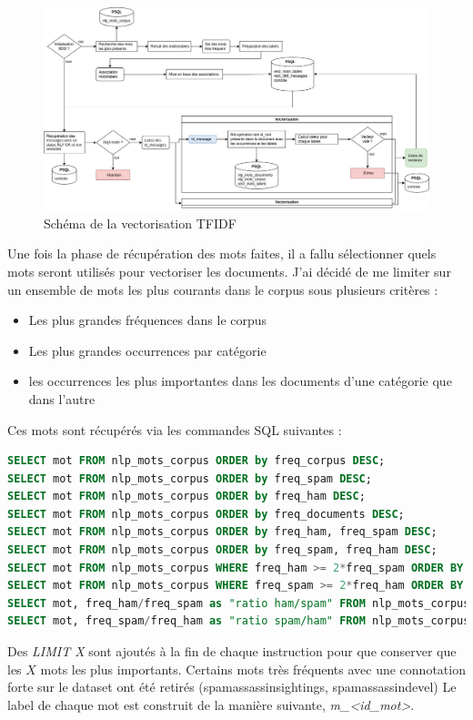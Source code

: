         \begin{figure}[H]
            \includegraphics[width=\linewidth]{img/tfidf}
            \caption{Schéma de la vectorisation TFIDF}
            \label{fig:tfidf}
        \end{figure}

        Une fois la phase de récupération des mots faites, il a fallu sélectionner quels mots seront utilisés pour vectoriser les documents.
        J'ai décidé de me limiter sur un ensemble de mots les plus courants dans le corpus sous plusieurs critères :
        \begin{itemize}
            \item Les plus grandes fréquences dans le corpus
            \item Les plus grandes occurrences par catégorie
            \item les occurrences les plus importantes dans les documents d'une catégorie que dans l'autre
        \end{itemize}
        Ces mots sont récupérés via les commandes SQL suivantes :
        \begin{lstlisting}[title=Commandes SQL pour récupérer les mots les plus présent, language=SQL]
SELECT mot FROM nlp_mots_corpus ORDER by freq_corpus DESC;
SELECT mot FROM nlp_mots_corpus ORDER by freq_spam DESC;
SELECT mot FROM nlp_mots_corpus ORDER by freq_ham DESC;
SELECT mot FROM nlp_mots_corpus ORDER by freq_documents DESC;
SELECT mot FROM nlp_mots_corpus ORDER by freq_ham, freq_spam DESC;
SELECT mot FROM nlp_mots_corpus ORDER by freq_spam, freq_ham DESC;
SELECT mot FROM nlp_mots_corpus WHERE freq_ham >= 2*freq_spam ORDER BY freq_ham DESC;
SELECT mot FROM nlp_mots_corpus WHERE freq_spam >= 2*freq_ham ORDER BY freq_spam DESC;
SELECT mot, freq_ham/freq_spam as "ratio ham/spam" FROM nlp_mots_corpus WHERE freq_ham > 0 AND freq_spam > 0 ORDER BY "ratio ham/spam" DESC;
SELECT mot, freq_spam/freq_ham as "ratio spam/ham" FROM nlp_mots_corpus WHERE freq_ham > 0 AND freq_spam > 0 ORDER BY "ratio spam/ham" DESC;
        \end{lstlisting}
        Des \emph{LIMIT X} sont ajoutés à la fin de chaque instruction pour que conserver que les $X$ mots les plus importants.
        Certains mots très fréquents avec une connotation forte sur le dataset ont été retirés (spamassassinsightings, spamassassindevel)
        Le label de chaque mot est construit de la manière suivante, \emph{m\_<id\_mot>}.\\


